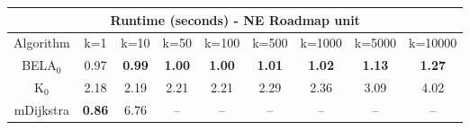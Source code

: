 \begin{tabular}{c|cccccccc}\toprule
\multicolumn{9}{c}{Runtime (seconds) - NE Roadmap unit}\\ \midrule
Algorithm & k=1 & k=10 & k=50 & k=100 & k=500 & k=1000 & k=5000 & k=10000 \\ \midrule
BELA$_0$ & 0.97 & \textbf{0.99} & \textbf{1.00} & \textbf{1.00} & \textbf{1.01} & \textbf{1.02} & \textbf{1.13} & \textbf{1.27} \\
K$_0$ & 2.18 & 2.19 & 2.21 & 2.21 & 2.29 & 2.36 & 3.09 & 4.02 \\
mDijkstra & \textbf{0.86} & 6.76 & -- & -- & -- & -- & -- & -- \\ \bottomrule 
\end{tabular}
